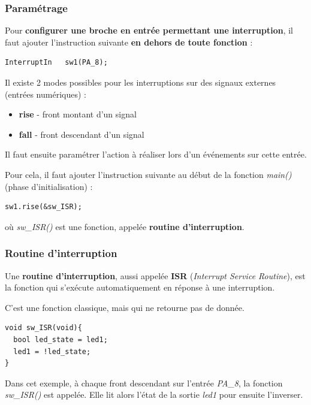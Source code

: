 \documentclass[a4paper,11pt,titlepage]{article} %
\begin{document}
\subsubsection{Paramétrage}

Pour \textbf{configurer une broche en entrée permettant une interruption}, il faut ajouter l'instruction suivante \textbf{en dehors de toute fonction} :

\begin{lstlisting}
InterruptIn   sw1(PA_8);
\end{lstlisting}

\medskip

Il existe 2 modes possibles pour les interruptions sur des signaux externes (entrées numériques) : 

\begin{itemize}
	\item \textbf{rise} - front montant d'un signal
	\item \textbf{fall} - front descendant d'un signal
\end{itemize}

\medskip

Il faut ensuite paramétrer l'action à réaliser lors d'un événements sur cette entrée.

Pour cela, il faut ajouter l'instruction suivante au début de la fonction \textsl{main()} (phase d'initialisation) :

\begin{lstlisting}
sw1.rise(&sw_ISR);
\end{lstlisting}

où \textsl{sw\_ISR()} est une fonction, appelée \textbf{routine d'interruption}.

\subsubsection{Routine d'interruption}

Une \textbf{routine d'interruption}, aussi appelée \textbf{ISR} (\textit{Interrupt Service Routine}), est la fonction qui s'exécute automatiquement en réponse à une interruption. 

C'est une fonction classique, mais qui ne retourne pas de donnée.

\begin{lstlisting}
void sw_ISR(void){
  bool led_state = led1;
  led1 = !led_state;
} 
\end{lstlisting}

Dans cet exemple, à chaque front descendant sur l'entrée \textsl{PA\_8}, la fonction \textsl{sw\_ISR()} est appelée. Elle lit alors l'état de la sortie \textsl{led1} pour ensuite l'inverser.
\end{document}
